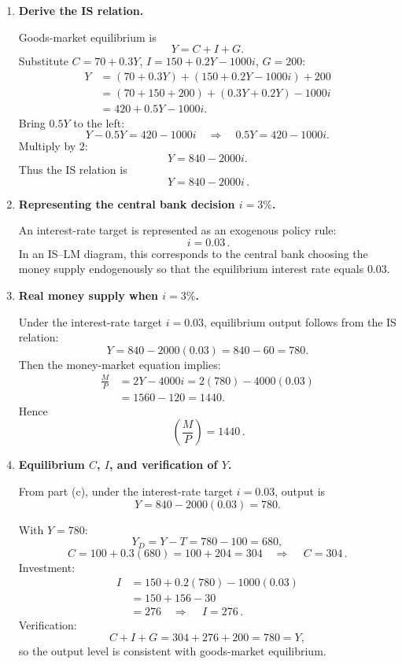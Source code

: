 \documentclass[12pt]{article}
\begin{document}
\begin{enumerate}[label=(\alph*)]
\item \textbf{Derive the IS relation.}

Goods-market equilibrium is
\[
Y = C + I + G.
\]
Substitute \(C=70+0.3Y\), \(I=150+0.2Y-1000i\), \(G=200\):
\begin{align*}
Y &= (70+0.3Y) + (150+0.2Y-1000i) + 200 \\
  &= (70+150+200) + (0.3Y+0.2Y) - 1000i \\
  &= 420 + 0.5Y - 1000i.
\end{align*}
Bring \(0.5Y\) to the left:
\[
Y - 0.5Y = 420 - 1000i
\quad\Longrightarrow\quad
0.5Y = 420 - 1000i.
\]
Multiply by \(2\):
\[
Y = 840 - 2000i.
\]
Thus the IS relation is
\[
\boxed{\,Y = 840 - 2000i\,}.
\]

\item \textbf{Representing the central bank decision \(i=3\%\).}

An interest-rate target is represented as an exogenous policy rule:
\[
\boxed{\,i = 0.03\,}.
\]
In an IS--LM diagram, this corresponds to the central bank choosing the money supply endogenously so that the equilibrium interest rate equals \(0.03\).

\item \textbf{Real money supply when \(i=3\%\).}

Under the interest-rate target \(i=0.03\), equilibrium output follows from the IS relation:
\[
Y = 840 - 2000(0.03) = 840 - 60 = 780.
\]
Then the money-market equation implies:
\begin{align*}
\frac{M}{P}
&= 2Y - 4000i
= 2(780) - 4000(0.03) \\
&= 1560 - 120
= 1440.
\end{align*}
Hence
\[
\boxed{\,\left(\frac{M}{P}\right)=1440\,}.
\]

\item \textbf{Equilibrium \(C\), \(I\), and verification of \(Y\).}

From part (c), under the interest-rate target \(i=0.03\), output is
\[
Y = 840 - 2000(0.03) = 780.
\]

With \(Y=780\):
\[
Y_D = Y-T = 780-100=680,
\]
\[
C = 100 + 0.3(680)=100+204=304
\quad\Rightarrow\quad
\boxed{\,C=304\,}.
\]
Investment:
\begin{align*}
I &= 150 + 0.2(780) - 1000(0.03) \\
  &= 150 + 156 - 30 \\
  &= 276
\quad\Rightarrow\quad
\boxed{\,I=276\,}.
\end{align*}
Verification:
\[
C+I+G = 304 + 276 + 200 = 780 = Y,
\]
so the output level is consistent with goods-market equilibrium.


\end{enumerate}
\end{document}
